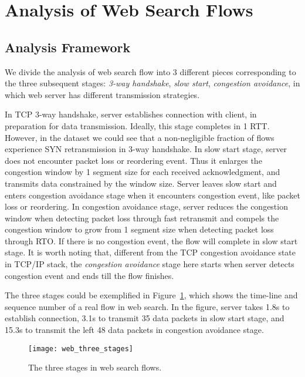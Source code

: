 
\section{Analysis of Web Search Flows}
\label{sec:web_search}


\subsection{Analysis Framework}

We divide the analysis of web search flow into 3 different pieces corresponding to the three subsequent stages: \emph{3-way handshake}, \emph{slow start}, \emph{congestion avoidance}, in which web server has different transmission strategies.

In TCP 3-way handshake, server establishes connection with client, in preparation for data transmission. Ideally, this stage completes in 1 RTT. However, in the dataset we could see that a non-negligible fraction of flows experience SYN retransmission in 3-way handshake. In slow start stage, server does not encounter packet loss or reordering event. Thus it enlarges the congestion window by 1 segment size for each received acknowledgment, and transmits data constrained by the window size. Server leaves slow start and enters congestion avoidance stage when it encounters congestion event, like packet loss or reordering. In congestion avoidance stage, server reduces the congestion window when detecting packet loss through fast retransmit\cite{jacobson1988congestion} and compels the congestion window to grow from 1 segment size when detecting packet loss through RTO. If there is no congestion event, the flow will complete in slow start stage. It is worth noting that, different from the TCP congestion avoidance state in TCP/IP stack, the \emph{congestion avoidance} stage here starts when server detects congestion event and ends till the flow finishes. 

The three stages could be exemplified in Figure~\ref{fig:web_three_stages}, which shows the time-line and sequence number of a real flow in web search. In the figure, server takes 1.8s to establish connection, 3.1s to transmit 35 data packets in slow start stage, and 15.3s to transmit the left 48 data packets in congestion avoidance stage.

\begin{figure}[th]
\centering
\texttt{[image: web\_three\_stages]}
\caption{The three stages in web search flows.}
\label{fig:web_three_stages}
\end{figure}

